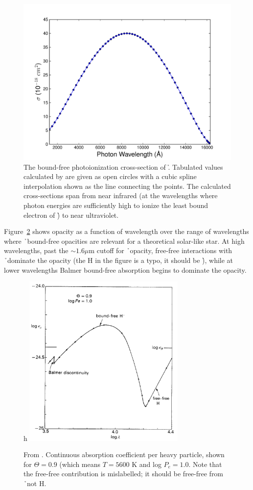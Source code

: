 \begin{figure}
\includegraphics[width=150mm]{figs/rrt.pdf}%
\caption{\label{fig:bfcrosssection}The bound-free photoionization
cross-section of \h. Tabulated values calculated
by \cite{wishart1979} are given as open circles with a cubic spline
interpolation shown as the line connecting the points.  The calculated
cross-sections span from near infrared (at the wavelengths where photon
energies are sufficiently high to ionize the least bound electron
of \h) to near ultraviolet.}
\end{figure}

Figure~\ref{fig:bohmopacity} shows  opacity as a function of wavelength over the range of wavelengths where \h\ bound-free opacities are relevant for a theoretical solar-like star.  At high wavelengths, past the $\sim 1.6 \mu$m cutoff for \h\ opacity, free-free interactions with \h\ dominate the opacity (the H in the figure is a typo, it should be \h), while at lower wavelengths Balmer bound-free absorption begins to dominate the opacity.
\begin{figure}{h}
\includegraphics[width=80mm]{figs/hminusopacity.png}
\caption{\label{fig:bohmopacity}From \cite{boehm1989}. Continuous absorption coefficient per heavy particle, shown for $\Theta=0.9$ (which means $T=5600$ K and log $P_e=1.0$.  Note that the free-free contribution is mislabelled; it should be free-free from \h\ not H.}
\end{figure}

